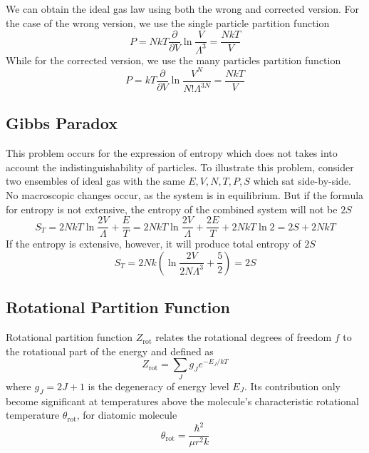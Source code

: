 \documentclass[../../../Main.tex]{subfiles}
\begin{document}
We can obtain the ideal gas law using both the wrong and corrected version. For the case of the wrong version, we use the single particle partition function
\begin{equation*}
	P=NkT\frac{\partial}{\partial V} \ln \frac{V}{\Lambda^3}=\frac{NkT}{V}
\end{equation*}
While for the corrected version, we use the many particles partition function
\begin{equation*}
	P=kT\frac{\partial}{\partial V} \ln \frac{V^N}{N!\Lambda^{3N}}=\frac{NkT}{V}
\end{equation*}

\subsection*{Gibbs Paradox}

This problem occurs for the expression of entropy which does not takes into account the indistinguishability of particles. To illustrate this problem, consider two ensembles of ideal gas with the same $E,V,N,T,P,S$ which sat side-by-side.  No macroscopic changes occur, as the system is in equilibrium. But if the formula for entropy is not extensive, the entropy of the combined system will not be $2S$
\begin{equation*}
	S_T=2NkT\ln\frac{2V}{\Lambda}+\frac{E}{T}=2NkT\ln\frac{2V}{\Lambda}+\frac{2E}{T}+2NkT\ln2=2S+2NkT
\end{equation*}
If the entropy is extensive, however, it will produce total entropy of $2S$
\begin{equation*}
	S_T=2Nk\left(\ln\frac{2V}{2N\Lambda^3}+\frac{5}{2}\right)=2S
\end{equation*}

\subsection*{Rotational Partition Function}

Rotational partition function $Z_\text{rot}$ relates the rotational degrees of freedom $f$ to the rotational part of the energy and defined as
\begin{equation*}
	Z_\text{rot}=\sum_{J} g_Je^{-E_J/kT}
\end{equation*}
where $g_J=2J+1$ is the degeneracy of energy level $E_J$. Its contribution only become significant at temperatures above the molecule's characteristic rotational temperature $\theta_\text{rot}$, for diatomic molecule
\begin{equation*}
	\theta_\text{rot}=\frac{\hbar^2}{\mu r^2 k}
\end{equation*}
\end{document}
